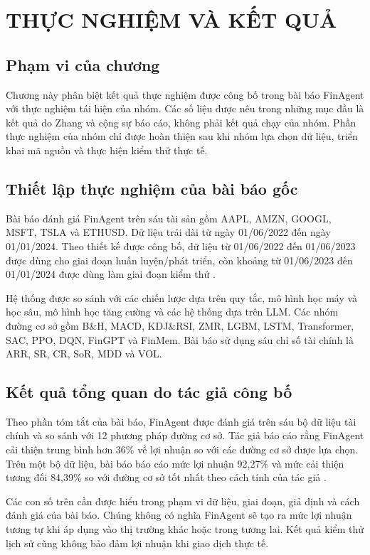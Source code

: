 \chapter{THỰC NGHIỆM VÀ KẾT QUẢ}

\section{Phạm vi của chương}

Chương này phân biệt kết quả thực nghiệm được công bố trong bài báo FinAgent với thực nghiệm tái hiện của nhóm. Các số liệu được nêu trong những mục đầu là kết quả do Zhang và cộng sự báo cáo, không phải kết quả chạy của nhóm. Phần thực nghiệm của nhóm chỉ được hoàn thiện sau khi nhóm lựa chọn dữ liệu, triển khai mã nguồn và thực hiện kiểm thử thực tế.

\section{Thiết lập thực nghiệm của bài báo gốc}

Bài báo đánh giá FinAgent trên sáu tài sản gồm AAPL, AMZN, GOOGL, MSFT, TSLA và ETHUSD. Dữ liệu trải dài từ ngày 01/06/2022 đến ngày 01/01/2024. Theo thiết kế được công bố, dữ liệu từ 01/06/2022 đến 01/06/2023 được dùng cho giai đoạn huấn luyện/phát triển, còn khoảng từ 01/06/2023 đến 01/01/2024 được dùng làm giai đoạn kiểm thử \cite{zhang2024finagent}.

Hệ thống được so sánh với các chiến lược dựa trên quy tắc, mô hình học máy và học sâu, mô hình học tăng cường và các hệ thống dựa trên LLM. Các nhóm đường cơ sở gồm B\&H, MACD, KDJ\&RSI, ZMR, LGBM, LSTM, Transformer, SAC, PPO, DQN, FinGPT và FinMem. Bài báo sử dụng sáu chỉ số tài chính là ARR, SR, CR, SoR, MDD và VOL.

\section{Kết quả tổng quan do tác giả công bố}

Theo phần tóm tắt của bài báo, FinAgent được đánh giá trên sáu bộ dữ liệu tài chính và so sánh với 12 phương pháp đường cơ sở. Tác giả báo cáo rằng FinAgent cải thiện trung bình hơn 36\% về lợi nhuận so với các đường cơ sở được lựa chọn. Trên một bộ dữ liệu, bài báo báo cáo mức lợi nhuận 92,27\% và mức cải thiện tương đối 84,39\% so với đường cơ sở tốt nhất theo cách tính của tác giả \cite{zhang2024finagent}.

Các con số trên cần được hiểu trong phạm vi dữ liệu, giai đoạn, giả định và cách đánh giá của bài báo. Chúng không có nghĩa FinAgent sẽ tạo ra mức lợi nhuận tương tự khi áp dụng vào thị trường khác hoặc trong tương lai. Kết quả kiểm thử lịch sử cũng không bảo đảm lợi nhuận khi giao dịch thực tế.

